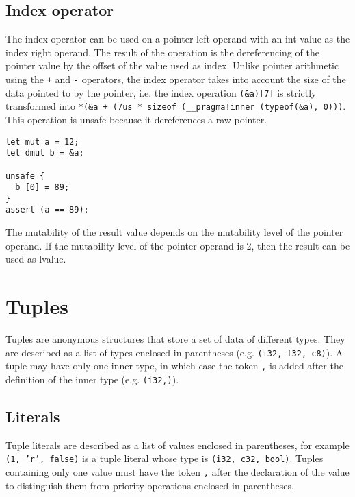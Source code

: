 \subsection {Index operator}

The index operator can be used on a pointer left operand with an int value as
the index right operand. The result of the operation is the dereferencing of the
pointer value by the offset of the value used as index. Unlike pointer
arithmetic using the \texttt{+} and \texttt{-} operators, the index operator
takes into account the size of the data pointed to by the pointer, i.e. the
index operation \texttt{(\&a)[7]} is strictly transformed into \texttt{*(\&a +
  (7us * sizeof (\_\_pragma!inner (typeof(\&a), 0)))}. This operation is unsafe because it
dereferences a raw pointer.

\smallskip

\begin{lstlisting}[style=coloredverbatim]
let mut a = 12;
let dmut b = &a;

unsafe {
  b [0] = 89;
}
assert (a == 89);
\end{lstlisting}

\smallskip

The mutability of the result value depends on the mutability level of the
pointer operand. If the mutability level of the pointer operand is 2, then the
result can be used as lvalue.

\section {Tuples}


Tuples are anonymous structures that store a set of data of different types.
They are described as a list of types enclosed in parentheses (e.g.
\texttt{(i32, f32, c8)}). A tuple may have only one inner type, in which case
the token \texttt{,} is added after the definition of the inner type (e.g.
\texttt{(i32,)}).

\subsection {Literals}

Tuple literals are described as a list of values enclosed in parentheses, for
example \texttt{(1, 'r', false)} is a tuple literal whose type is \texttt{(i32,
  c32, bool)}. Tuples containing only one value must have the token \texttt{,}
after the declaration of the value to distinguish them from priority operations
enclosed in parentheses.

